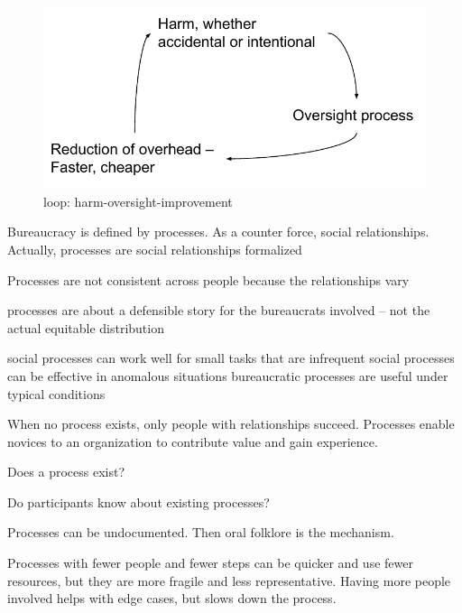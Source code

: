 \begin{figure}
    \centering
    \includegraphics{images/process_loop_harm-oversight-improvement}
    \caption{loop: harm-oversight-improvement}
    \label{fig:harm-oversight-improvement}
\end{figure}



Bureaucracy is defined by processes.
As a counter force, social relationships.
Actually, processes are social relationships formalized

Processes are not consistent across people because the relationships vary


processes are about a defensible story for the bureaucrats involved -- not the actual equitable distribution



social processes can work well for small tasks that are infrequent
social processes can be effective in anomalous situations
bureaucratic processes are useful under typical conditions

When no process exists, only people with relationships succeed. Processes enable novices to an organization to contribute value and gain experience. 





Does a process exist?

Do participants know about existing processes?

Processes can be undocumented. Then oral folklore is the mechanism. 

Processes with fewer people and fewer steps can be quicker and use fewer resources, but they are more fragile and less representative. Having more people involved helps with edge cases, but slows down the process. 


